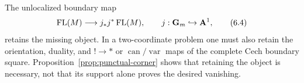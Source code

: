 The unlocalized boundary map
\[
 \operatorname{FL}(M)\longrightarrow j_*j^*\operatorname{FL}(M),\qquad
 j:\mathbf G_m\hookrightarrow\mathbf A^1,                                  \tag{6.4}
\]
retains the missing object.  In a two-coordinate problem one must also retain
the orientation, duality, and \(!\to *\) or
\(\operatorname{can}/\operatorname{var}\) maps of the complete Cech boundary
square.  Proposition~\ref{prop:punctual-corner} shows that retaining the
object is necessary, not that its support alone proves the desired vanishing.
